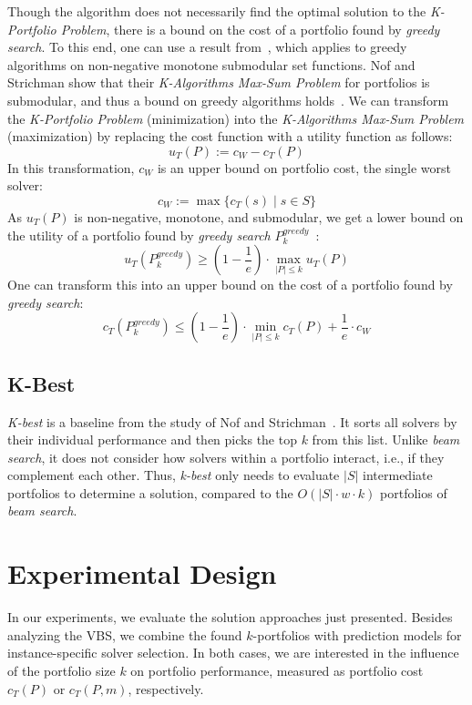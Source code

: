 \documentclass[a4paper,USenglish,pdfa]{lipics-v2021} %
\begin{document}
Though the algorithm does not necessarily find the optimal solution to the \emph{K-Portfolio Problem}, there is a bound on the cost of a portfolio found by \emph{greedy search}. 
To this end, one can use a result from~\cite{nemhauser1978analysis}, which applies to greedy algorithms on non-negative monotone submodular set functions.
Nof and Strichman show that their \emph{K-Algorithms Max-Sum Problem} for portfolios is submodular, and thus a bound on greedy algorithms holds~\cite{nof2020real}. 
We can transform the \emph{K-Portfolio Problem} (minimization) into the \emph{K-Algorithms Max-Sum Problem} (maximization) by replacing the cost function with a utility function as follows:%
\[
u_{T}(P) := c_W - c_{T}(P)
\]
In this transformation, $c_W$ is an upper bound on portfolio cost, the single worst solver:%
\[
c_W := \max\{c_T(s) \mid s \in S\}
\]
As $u_{T}(P)$ is non-negative, monotone, and submodular, we get a lower bound on the utility of a portfolio found by \emph{greedy search} $P_k^{greedy}$~\cite{nemhauser1978analysis,krause2014submodular}:%
\[
	u_{T}(P_k^{greedy}) \geq (1 - \frac{1}{e}) \cdot \max_{|P| \leq k}{u_{T}(P)}
\]
One can transform this into an upper bound on the cost of a portfolio found by \emph{greedy search}:%
\begin{equation}
	c_{T}(P_k^{greedy}) \leq (1 - \frac{1}{e}) \cdot \min_{|P| \leq k}{c_{T}(P)} + \frac{1}{e} \cdot c_W
	\label{eq:upper-bound}
\end{equation}

\subsection{K-Best}
\label{sec:approach:k-best}

\emph{K-best} is a baseline from the study of Nof and Strichman~\cite{nof2020real}. 
It sorts all solvers by their individual performance and then picks the top $k$ from this list.
Unlike \emph{beam search}, it does not consider how solvers within a portfolio interact, i.e., if they complement each other.
Thus, \emph{k-best} only needs to evaluate $|S|$ intermediate portfolios to determine a solution, compared to the $O(|S| \cdot w \cdot k)$ portfolios of \emph{beam search}.

\section{Experimental Design}
\label{sec:experimental-design}

In our experiments, we evaluate the solution approaches just presented.
Besides analyzing the VBS, we combine the found $k$-portfolios with prediction models for instance-specific solver selection. 
In both cases, we are interested in the influence of the portfolio size $k$ on portfolio performance, measured as portfolio cost $c_T(P)$ or $c_T(P,m)$, respectively. 
\end{document}
